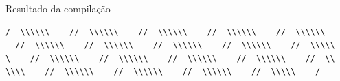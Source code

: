 \begin{example}{Resultado da compilação}
\begin{verbatim}
/  \\\\\\    //  \\\\\\    //  \\\\\\    //  \\\\\\    //  \\\\\\  
  //  \\\\\\    //  \\\\\\    //  \\\\\\    //  \\\\\\    //  \\\\\
\    //  \\\\\\    //  \\\\\\    //  \\\\\\    //  \\\\\\    //  \\
\\\\    //  \\\\\\    //  \\\\\\    //  \\\\\\    //  \\\\\    /
\end{verbatim}
\end{example}

